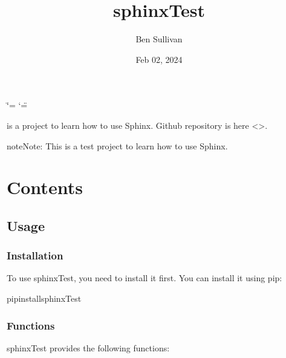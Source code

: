 \documentclass[letterpaper,10pt,english]{sphinxmanual}
\title{sphinxTest}
\date{Feb 02, 2024}
\author{Ben Sullivan}
\begin{document}
\ifdefined\shorthandoff
  \ifnum\catcode`\=\string=\active\shorthandoff{=}\fi
  \ifnum\catcode`\"=\active{}\fi
\fi

\pagestyle{empty}
\sphinxmaketitle
\pagestyle{plain}
\sphinxtableofcontents
\pagestyle{normal}
\label{\detokenize{index::doc}}


\sphinxAtStartPar
{} is a  project to learn how to use Sphinx. Github repository is here \textless{}\textgreater{}.

\begin{sphinxadmonition}{note}{Note:}
\sphinxAtStartPar
This is a test project to learn how to use Sphinx.
\end{sphinxadmonition}


\chapter{Contents}
\label{\detokenize{index:contents}}
\sphinxstepscope


\section{Usage}
\label{\detokenize{usage:usage}}\label{\detokenize{usage::doc}}

\subsection{Installation}
\label{\detokenize{usage:installation}}
\sphinxAtStartPar
To use sphinxTest, you need to install it first. You can install it using pip:

\begin{sphinxVerbatim}[commandchars=\\\{\}]
pipinstallsphinxTest
\end{sphinxVerbatim}


\subsection{Functions}
\label{\detokenize{usage:functions}}
\sphinxAtStartPar
sphinxTest provides the following functions:

\sphinxAtStartPar
{}
\end{document}
